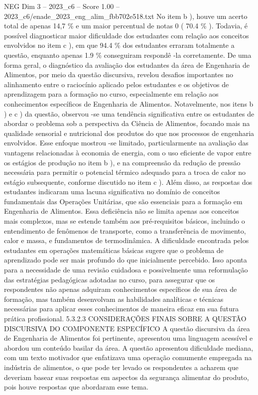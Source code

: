 \begin{textsample}{NEG Dim 3 – 2023\_c6 – Score 1.00 – 2023\_c6/enade\_2023\_eng\_alim\_fbb702e518.txt}
No item b ), houve um acerto total de apenas 14,7 \% e um maior percentual de notas 0 ( 70.4 \% ).
Todavia, é possível diagnosticar maior dificuldade dos estudantes com relação aos conceitos envolvidos no item c ), em que 94.4 \% dos estudantes erraram totalmente a questão, enquanto apenas 1.9 \% conseguiram respondê -la corretamente.
De uma forma geral, o diagnóstico da avaliação dos estudantes da área de Engenharia de Alimentos, por meio da questão discursiva, revelou desafios importantes no alinhamento entre o raciocínio aplicado pelos estudantes e os objetivos de aprendizagem para a formação no curso, especialmente em relação aos conhecimentos específicos de Engenharia de Alimentos.
Notavelmente, nos itens b ) e c ) da questão, observou -se uma tendência significativa entre os estudantes de abordar o problema sob a perspectiva da Ciência de Alimentos, focando mais na qualidade sensorial e nutricional dos produtos do que nos processos de engenharia envolvidos.
Esse enfoque mostrou -se limitado, particularmente na avaliação das vantagens relacionadas à economia de energia, com o uso eficiente de vapor entre os estágios de produção no item b ), e na compreensão da redução de pressão necessária para permitir o potencial térmico adequado para a troca de calor no estágio subsequente, conforme discutido no item c ).
Além disso, as respostas dos estudantes indicaram uma lacuna significativa no domínio de conceitos fundamentais das Operações Unitárias, que são essenciais para a formação em Engenharia de Alimentos.
Essa deficiência não se limita apenas aos conceitos mais complexos, mas se estende também aos pré-requisitos básicos, incluindo o entendimento de fenômenos de transporte, como a transferência de movimento, calor e massa, e fundamentos de termodinâmica.
A dificuldade encontrada pelos estudantes em operações matemáticas básicas sugere que o problema de aprendizado pode ser mais profundo do que inicialmente percebido.
Isso aponta para a necessidade de uma revisão cuidadosa e possivelmente uma reformulação das estratégias pedagógicas adotadas no curso, para assegurar que os respondentes não apenas adquiram conhecimentos específicos de sua área de formação, mas também desenvolvam as habilidades analíticas e técnicas necessárias para aplicar esses conhecimentos de maneira eficaz em sua futura prática profissional. 5.3.2.3 CONSIDERAÇÕES FINAIS SOBRE A QUESTÃO DISCURSIVA DO COMPONENTE ESPECÍFICO A questão discursiva da área de Engenharia de Alimentos foi pertinente, apresentou uma linguagem acessível e abordou um conteúdo basilar da área.
A questão apresentou dificuldade mediana, com um texto motivador que enfatizava uma operação comumente empregada na indústria de alimentos, o que pode ter levado os respondentes a acharem que deveriam basear suas respostas em aspectos da segurança alimentar do produto, pois houve respostas que abordaram esse tema.

\end{textsample}
